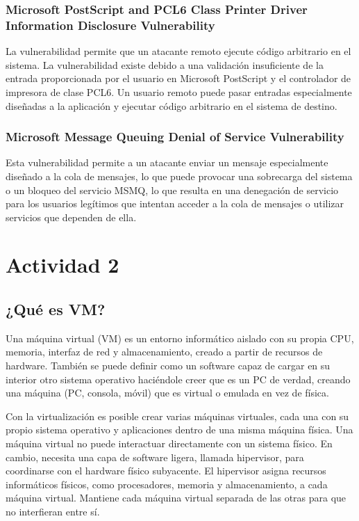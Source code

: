 \documentclass[stu, 11pt, letterpaper, donotrepeattitle, floatsintext, natbib]{apa7}
\begin{document}
\subsubsection{Microsoft PostScript and PCL6 Class Printer Driver Information Disclosure Vulnerability}

La vulnerabilidad permite que un atacante remoto ejecute código arbitrario en el sistema. La vulnerabilidad existe debido a una validación insuficiente de la entrada proporcionada por el usuario en Microsoft PostScript y el controlador de impresora de clase PCL6. Un usuario remoto puede pasar entradas especialmente diseñadas a la aplicación y ejecutar código arbitrario en el sistema de destino.

\subsubsection{Microsoft Message Queuing Denial of Service Vulnerability}

Esta vulnerabilidad permite a un atacante enviar un mensaje especialmente diseñado a la cola de mensajes, lo que puede provocar una sobrecarga del sistema o un bloqueo del servicio MSMQ, lo que resulta en una denegación de servicio para los usuarios legítimos que intentan acceder a la cola de mensajes o utilizar servicios que dependen de ella.

\newpage

\section{\large Actividad 2}

\subsection{¿Qué es VM?} 

Una máquina virtual (VM) es un entorno informático aislado con su propia CPU, memoria, interfaz de red y almacenamiento, creado a partir de recursos de hardware. También se puede definir como un software capaz de cargar en su interior otro sistema operativo haciéndole creer que es un PC de verdad, creando una máquina (PC, consola, móvil) que es virtual o emulada en vez de física. 

Con la virtualización es posible crear varias máquinas virtuales, cada una con su propio sistema operativo y aplicaciones dentro de una misma máquina física. Una máquina virtual no puede interactuar directamente con un sistema físico. En cambio, necesita una capa de software ligera, llamada hipervisor, para coordinarse con el hardware físico subyacente. El hipervisor asigna recursos informáticos físicos, como procesadores, memoria y almacenamiento, a cada máquina virtual. Mantiene cada máquina virtual separada de las otras para que no interfieran entre sí. 
\end{document}
